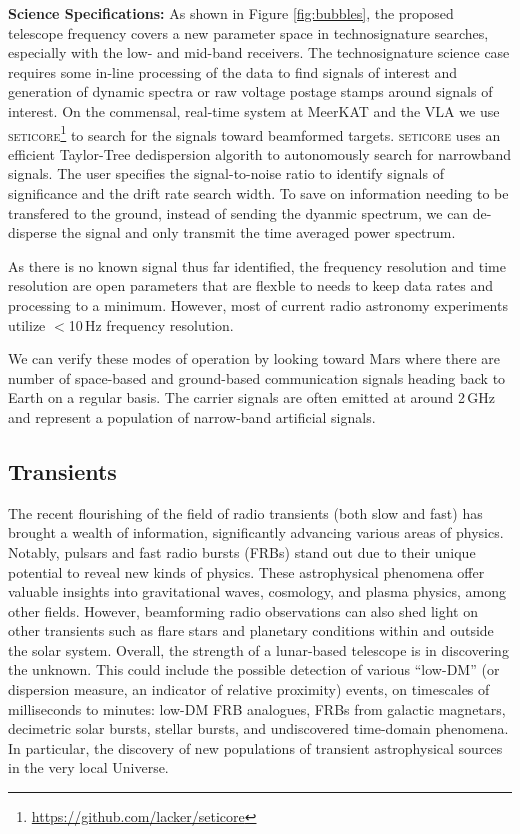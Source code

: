 \textbf{Science Specifications:} As shown in Figure \ref{fig:bubbles}, the proposed telescope frequency covers a new parameter space in technosignature searches, especially with the low- and mid-band receivers. The technosignature science case requires some in-line processing of the data to find signals of interest and generation of dynamic spectra or raw voltage postage stamps around signals of interest. On the commensal, real-time system at MeerKAT and the VLA \citep{Tremblay_2024} we use \textsc{seticore}\footnote{\url{https://github.com/lacker/seticore}} to search for the signals toward beamformed targets. \textsc{seticore} uses an efficient Taylor-Tree dedispersion algorith to autonomously search for narrowband signals. The user specifies the signal-to-noise ratio to identify signals of significance and the drift rate search width. To save on information needing to be transfered to the ground, instead of sending the dyanmic spectrum, we can de-disperse the signal and only transmit the time averaged power spectrum. 

As there is no known signal thus far identified, the frequency resolution and time resolution are open parameters that are flexble to needs to keep data rates and processing to a minimum. However, most of current radio astronomy experiments utilize $<$10\,Hz frequency resolution. 

We can verify these modes of operation by looking toward Mars where there are number of space-based and ground-based communication signals heading back to Earth on a regular basis. The carrier signals are often emitted at around 2\,GHz and represent a population of narrow-band artificial signals.

\subsection{Transients}
The recent flourishing of the field of radio transients (both slow and fast) has brought a wealth of information, significantly advancing various areas of physics. Notably, pulsars and fast radio bursts (FRBs) stand out due to their unique potential to reveal new kinds of physics. These astrophysical phenomena offer valuable insights into gravitational waves, cosmology, and plasma physics, among other fields. However, beamforming radio observations can also shed light on other transients such as flare stars and planetary conditions within and outside the solar system. Overall, the strength of a lunar-based telescope is in discovering the unknown. This could include the possible detection of various “low-DM” (or dispersion measure, an indicator of relative proximity) events, on timescales of milliseconds to minutes: low-DM FRB analogues, FRBs from galactic magnetars, decimetric solar bursts, stellar bursts, and undiscovered time-domain phenomena. In particular, the discovery of new populations of transient astrophysical sources in the very local Universe.

